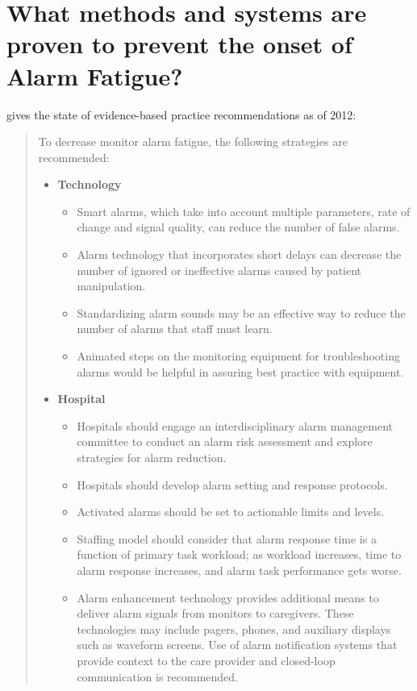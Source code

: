 \section{What methods and systems are proven to prevent the onset of Alarm Fatigue?}

\citep[p.277]{cvach2012monitor} gives the state of evidence-based practice recommendations as of 2012:\\

\begin{quotation}
	To decrease monitor alarm fatigue, the following strategies are recommended:
	\begin{itemize}
		\item \textbf{Technology}
		\begin{itemize}
			\item Smart alarms, which take into account multiple parameters, rate of change and signal quality, can reduce the number of false alarms.
			\item Alarm technology that incorporates short delays can decrease the number of ignored or ineffective alarms caused by patient manipulation.
			\item Standardizing alarm sounds may be an effective way to reduce the number of alarms that staff must learn.
			\item Animated steps on the monitoring equipment for troubleshooting alarms would be helpful in assuring best practice with equipment.
		\end{itemize}
		\item \textbf{Hospital}
		\begin{itemize}
			\item Hospitals should engage an interdisciplinary alarm management committee to conduct an alarm risk assessment and explore strategies for alarm reduction.
			\item Hospitals should develop alarm setting and response protocols.
			\item Activated alarms should be set to actionable limits and levels.
			\item Staffing model should consider that alarm response time is a function of primary task workload; as workload increases, time to alarm response increases, and alarm task performance gets worse.
			\item Alarm enhancement technology provides additional means to deliver alarm signals from monitors to caregivers. These technologies may include pagers, phones, and auxiliary displays such as waveform screens. Use of alarm notification systems that provide context to the care provider and closed-loop communication is recommended.

\end{itemize}
\end{itemize}
\end{quotation}

